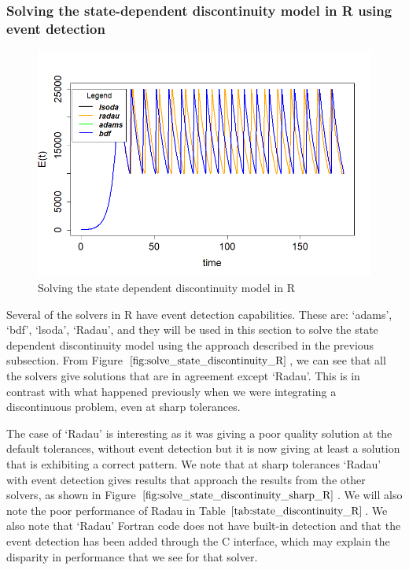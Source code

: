 \subsubsection{Solving the state-dependent discontinuity model in R using event detection}
\begin{figure}[H]
\centering
\includegraphics[width=0.7\linewidth]{./figures/solve_state_discontinuity_R}
\caption{Solving the state dependent discontinuity model in R}
\label{fig:solve_state_discontinuity_R}
\end{figure}
Several of the solvers in R have event detection capabilities. These are: `adams', `bdf', `lsoda', `Radau', and they will be used in this section to solve the state dependent discontinuity model using the approach described in the previous subsection. From Figure $\ref{fig:solve_state_discontinuity_R}$, we can see that all the solvers give solutions that are in agreement except `Radau'. This is in contrast with what happened previously when we were integrating a discontinuous problem, even at sharp tolerances. 

The case of `Radau' is interesting as it was giving a poor quality solution at the default tolerances, without event detection but it is now giving at least a solution that is exhibiting a correct pattern. We note that at sharp tolerances `Radau' with event detection gives results that approach the results from the other solvers, as shown in Figure $\ref{fig:solve_state_discontinuity_sharp_R}$. We will also note the poor performance of Radau in Table $\ref{tab:state_discontinuity_R}$. We also note that `Radau' Fortran code does not have built-in detection and that the event detection has been added through the C interface, which may explain the disparity in performance that we see for that solver.

